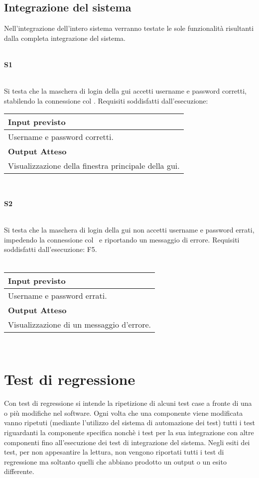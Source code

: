\subsection{Integrazione del sistema}
Nell'integrazione dell'intero sistema verranno testate le sole funzionalit\`a risultanti dalla completa integrazione del sistema.\\
 \\
\begin{Large}\textbf{S1}\end{Large} \\
Si testa che la maschera di login della gui accetti username e password corretti, stabilendo la connessione col \rp.
Requisiti soddisfatti dall'esecuzione: \\
\begin{center}
\begin{tabular}{|p{11cm}|} \hline
\textbf{Input previsto}\\ \hline
Username e password corretti.\\ \hline
\textbf{Output Atteso}\\ \hline
Visualizzazione della finestra principale della gui.\\ \hline
\end{tabular} \\
\end{center}

\begin{Large}\textbf{S2}\end{Large} \\
Si testa che la maschera di login della gui  non accetti username e password errati, impedendo la connessione col \rp\ e riportando un messaggio di errore.
Requisiti soddisfatti dall'esecuzione: F5. \\
 \\
\begin{center}
\begin{tabular}{|p{11cm}|} \hline
\textbf{Input previsto}\\ \hline
Username e password errati.\\ \hline
\textbf{Output Atteso}\\ \hline
Visualizzazione di un messaggio d'errore.\\ \hline
\end{tabular} \\
\end{center}

\section{Test di regressione}
Con test di regressione si intende la ripetizione di alcuni test case a fronte di una o pi\`u modifiche nel software. Ogni volta che una componente viene modificata vanno ripetuti (mediante l'utilizzo del sistema di automazione dei test) tutti i test riguardanti la componente specifica nonch\`e i test per la sua integrazione con altre componenti fino all'esecuzione dei test di integrazione del sistema.
Negli esiti dei test, per non appesantire la lettura, non vengono riportati tutti i test di regressione ma soltanto quelli che abbiano prodotto un output o un esito differente.

